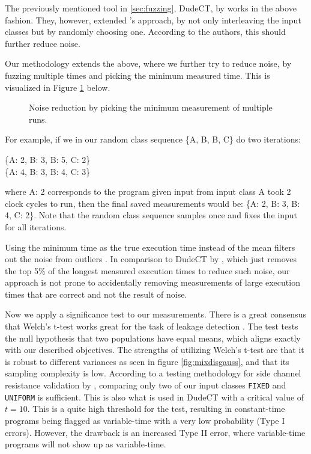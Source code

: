 The previously mentioned tool in \ref{sec:fuzzing}, DudeCT, by \citeauthor{dudect} works in the above fashion. They, however, extended \citeauthor{Coron_2004}'s approach, by not only interleaving the input classes but by randomly choosing one. According to the authors, this should further reduce noise.

Our methodology extends the above, where we further try to reduce noise, by fuzzing multiple times and picking the minimum measured time. This is visualized in Figure \ref{fig:noisered} below. 
\begin{figure}[H]
    \centering
    
    \caption{Noise reduction by picking the minimum measurement of multiple runs.}
    \label{fig:noisered}
\end{figure}
For example, if we in our random class sequence \{A, B, B, C\} do two iterations:
\begin{center}
    \{A: 2, B: 3, B: 5, C: 2\} \\
    \{A: 4, B: 3, B: 4, C: 3\}
\end{center}
where A: 2 corresponds to the program given input from input class A took 2 clock cycles to run, then the final saved measurements would be: \{A: 2, B: 3, B: 4, C: 2\}. Note that the random class sequence samples once and fixes the input for all iterations.

Using the minimum time as the true execution time instead of the mean filters out the noise from outliers  \citep{robust-benchmarking}.
In comparison to DudeCT by \citeauthor{dudect}, which just removes the top 5\% of the longest measured execution times to reduce such noise, our approach is not prone to accidentally removing measurements of large execution times that are correct and not the result of noise.

Now we apply a significance test to our measurements. There is a great consensus that Welch's t-test \citep{WELCH1947} works great for the task of leakage detection \citep{cryptoeprint:2015/536}.
The test tests the null hypothesis that two populations have equal means, which aligns exactly with our described objectives. The strengths of utilizing Welch's t-test are that it is robust to different variances as seen in figure \ref{fig:mixdisgauss}, and that its sampling complexity is low. According to a testing methodology for side channel resistance validation by \citeauthor{Goodwill2011ATM}, comparing only two of our input classes \texttt{FIXED} and \texttt{UNIFORM} is sufficient.
This is also what is used in DudeCT \citep{dudect} with a critical value of $t = 10$. 
This is a quite high threshold for the test, resulting in constant-time programs being flagged as variable-time with a very low probability (Type I errors).
However, the drawback is an increased Type II error, where variable-time programs will not show up as variable-time.

